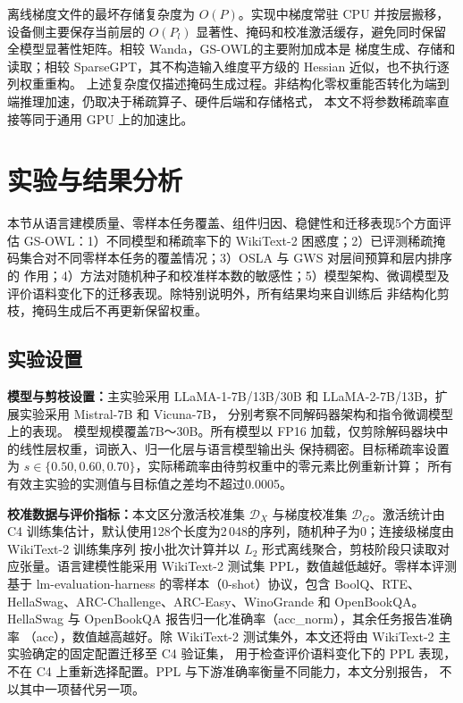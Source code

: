 \documentclass[UTF8,fontset=fandol]{ctexart}
\newcommand{\method}{GS-OWL}
\begin{document}
离线梯度文件的最坏存储复杂度为 $O(P)$。实现中梯度常驻 CPU 并按层搬移，设备侧主要保存当前层的
$O(P_l)$ 显著性、掩码和校准激活缓存，避免同时保留全模型显著性矩阵。相较 Wanda，\method 的主要附加成本是
梯度生成、存储和读取；相较 SparseGPT，其不构造输入维度平方级的 Hessian 近似，也不执行逐列权重重构。
上述复杂度仅描述掩码生成过程。非结构化零权重能否转化为端到端推理加速，仍取决于稀疏算子、硬件后端和存储格式，
本文不将参数稀疏率直接等同于通用 GPU 上的加速比。

\section{实验与结果分析}

本节从语言建模质量、零样本任务覆盖、组件归因、稳健性和迁移表现5个方面评估 \method：1）不同模型和稀疏率下的
WikiText-2 困惑度；2）已评测稀疏掩码集合对不同零样本任务的覆盖情况；3）OSLA 与 GWS 对层间预算和层内排序的
作用；4）方法对随机种子和校准样本数的敏感性；5）模型架构、微调模型及评价语料变化下的迁移表现。除特别说明外，所有结果均来自训练后
非结构化剪枝，掩码生成后不再更新保留权重。

\subsection{实验设置}

\textbf{模型与剪枝设置：}主实验采用 LLaMA-1-7B/13B/30B 和 LLaMA-2-7B/13B，扩展实验采用 Mistral-7B 和 Vicuna-7B，
分别考察不同解码器架构和指令微调模型上的表现。
模型规模覆盖7B～30B。所有模型以 FP16 加载，仅剪除解码器块中的线性层权重，词嵌入、归一化层与语言模型输出头
保持稠密。目标稀疏率设置为 $s\in\{0.50,0.60,0.70\}$，实际稀疏率由待剪权重中的零元素比例重新计算；
所有有效主实验的实测值与目标值之差均不超过0.0005。

\textbf{校准数据与评价指标：}本文区分激活校准集 $\mathcal D_X$ 与梯度校准集 $\mathcal D_G$。激活统计由
C4\cite{c4} 训练集估计，默认使用128个长度为2\,048的序列，随机种子为0；连接级梯度由 WikiText-2 训练集序列
按小批次计算并以 $L_2$ 形式离线聚合，剪枝阶段只读取对应张量。语言建模性能采用
WikiText-2\cite{wikitext} 测试集 PPL，数值越低越好。零样本评测基于 lm-evaluation-harness 的零样本（0-shot）协议，包含
BoolQ\cite{boolq}、RTE\cite{glue}、HellaSwag\cite{hellaswag}、ARC-Challenge、ARC-Easy\cite{arc}、WinoGrande\cite{winogrande}
和 OpenBookQA\cite{openbookqa}。HellaSwag 与 OpenBookQA 报告归一化准确率（acc\_norm），其余任务报告准确率
（acc），数值越高越好。除 WikiText-2 测试集外，本文还将由 WikiText-2 主实验确定的固定配置迁移至 C4 验证集，
用于检查评价语料变化下的 PPL 表现，不在 C4 上重新选择配置。PPL 与下游准确率衡量不同能力，本文分别报告，
不以其中一项替代另一项。
\end{document}
